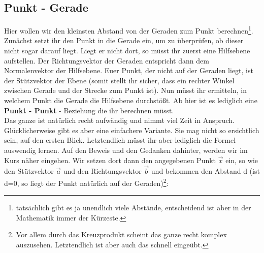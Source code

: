\subsection{Punkt - Gerade}
	Hier wollen wir den kleinsten Abstand von der Geraden zum Punkt
	berechnen\footnote{tatsächlich gibt es ja unendlich viele Abstände,
	entscheidend ist aber in der Mathematik immer der Kürzeste.}.\\
	Zunächst setzt ihr den Punkt in die Gerade ein, um zu überprüfen, ob dieser
	nicht sogar darauf liegt. Liegt er nicht dort, so müsst ihr zuerst eine
	Hilfsebene aufstellen. Der Richtungsvektor der Geraden entspricht dann dem
	Normalenvektor der Hilfsebene. Euer Punkt, der nicht auf der Geraden liegt, ist
	der Stützvektor der Ebene (somit stellt ihr sicher, dass ein rechter Winkel
	zwischen Gerade und der Strecke zum Punkt ist). Nun müsst ihr ermitteln, in
	welchem Punkt die Gerade die Hilfsebene durchstößt. Ab hier ist es lediglich
	eine \textbf{Punkt - Punkt} - Beziehung die ihr berechnen müsst.\\
	Das ganze ist natürlich recht aufwändig und nimmt viel Zeit in Anspruch.
	Glücklicherweise gibt es aber eine einfachere Variante. Sie mag nicht so
	ersichtlich sein, auf den ersten Blick. Letztendlich müsst ihr aber lediglich
	die Formel auswendig lernen. Auf den Beweis und den Gedanken dahinter, werden
	wir im Kurs näher eingehen. Wir setzen dort dann den angegebenen Punkt
	\(\vec{x}\) ein, so wie den Stützvektor \(\vec{a}\) und den Richtungsvektor
	\(\vec{b}\) und bekommen den Abstand d (ist d=0, so liegt der Punkt natürlich
	auf der Geraden)\footnote{Vor allem durch das Kreuzprodukt scheint das ganze
	recht komplex auszusehen. Letztendlich ist aber auch das schnell eingeübt.}:
	\formel{\[d=\frac{|(\vec{a}-\vec{x})\times \vec{b}|}{|\vec{b}|}\]}
	
